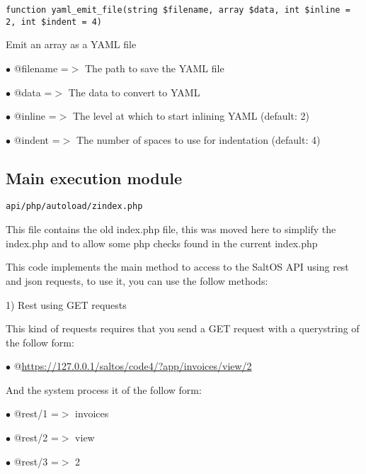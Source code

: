 \documentclass[a4paper]{article}
\def\htmladdnormallink#1#2{\href{#2}{#1}}
\begin{document}
\begin{lstlisting}
function yaml_emit_file(string $filename, array $data, int $inline = 2, int $indent = 4)
\end{lstlisting}

Emit an array as a YAML file

\begin{compactitem}
\item[\color{myblue}$\bullet$] @filename =$>$ The path to save the YAML file
\item[\color{myblue}$\bullet$] @data     =$>$ The data to convert to YAML
\item[\color{myblue}$\bullet$] @inline   =$>$ The level at which to start inlining YAML (default: 2)
\item[\color{myblue}$\bullet$] @indent   =$>$ The number of spaces to use for indentation (default: 4)
\end{compactitem}

\hypertarget{toc290}{}
\subsection{Main execution module}

\begin{lstlisting}
api/php/autoload/zindex.php
\end{lstlisting}

This file contains the old index.php file, this was moved here to simplify the index.php and to
allow some php checks found in the current index.php

This code implements the main method to access to the SaltOS API using rest and json requests, to
use it, you can use the follow methods:

1) Rest using GET requests

This kind of requests requires that you send a GET request with a querystring of the follow
form:

\begin{compactitem}
\item[\color{myblue}$\bullet$] @\htmladdnormallink{https://127.0.0.1/saltos/code4/?app/invoices/view/2}{https://127.0.0.1/saltos/code4/?app/invoices/view/2}
\end{compactitem}

And the system process it of the follow form:

\begin{compactitem}
\item[\color{myblue}$\bullet$] @rest/1 =$>$ invoices
\item[\color{myblue}$\bullet$] @rest/2 =$>$ view
\item[\color{myblue}$\bullet$] @rest/3 =$>$ 2
\end{compactitem}
\end{document}
